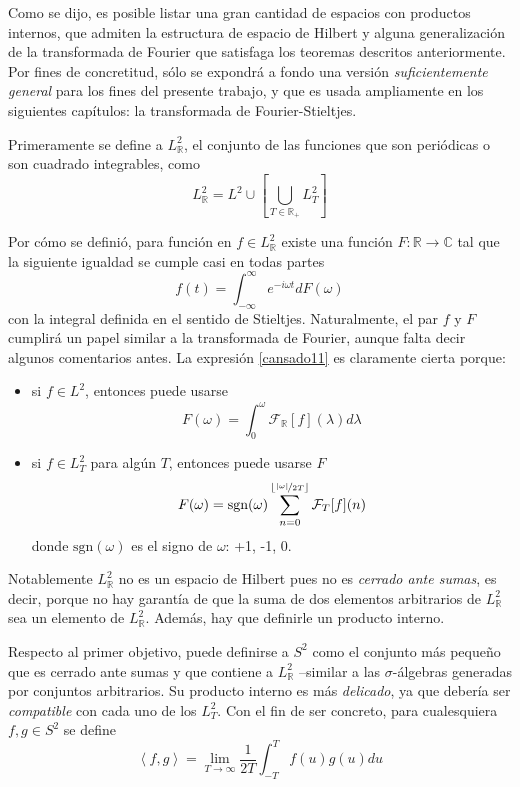 \documentclass[12pt,letterpaper]{book}
\newcommand{\R}{\mathbb{R}}
\newcommand{\C}{\mathbb{C}}
\newcommand{\intR}{\int_{-\infty}^{\infty}}
\newcommand{\abso}[1]{\left| #1 \right|}
\newcommand{\producto}[1]{\left\langle #1 \right\rangle}
\newcommand{\entero}[1]{\left\lfloor #1 \right\rfloor}
\begin{document}
Como se dijo, es posible listar una gran cantidad de espacios con productos internos, que admiten la estructura de espacio de Hilbert y alguna generalización de la transformada de Fourier que satisfaga los teoremas descritos anteriormente.
%
Por fines de concretitud, sólo se expondrá a fondo una versión \textit{suficientemente general} para los fines del presente trabajo, y que es usada ampliamente en los siguientes capítulos: la transformada de Fourier-Stieltjes.

Primeramente se define a $L^{2}_\R$, el conjunto de las funciones que son periódicas o son cuadrado integrables, como
\begin{equation}
L^{2}_\R = L^{2} \cup \left[ \bigcup_{T\in \R_+} L^{2}_T \right]
\end{equation}

Por cómo se definió, para función en $f \in L^{2}_\R$ existe una función $F: \R \rightarrow \C$ tal que la siguiente igualdad se cumple casi en todas partes
\begin{equation}
f(t) = \intR e^{-i \omega t} dF(\omega)
\label{cansado11}
\end{equation}
con la integral definida en el sentido de Stieltjes.
%
Naturalmente, el par $f$ y $F$ cumplirá un papel similar a la transformada de Fourier, aunque falta decir algunos comentarios antes.
%
La expresión \ref{cansado11} es claramente cierta porque:
\begin{itemize}
\item si $f \in L^{2}$, entonces puede usarse 
\begin{equation*}
F(\omega)=\int_{0}^{\omega} \mathcal{F}_\R[f](\lambda) d\lambda
\end{equation*}
\item si $f \in L^{2}_T$ para algún $T$, entonces puede usarse $F$
\begin{equation*}
F(\omega) =  \text{sgn}(\omega) \sum_{n = 0}^{\entero{\nicefrac{\abso{\omega}}{2T}}} \mathcal{F}_T[f](n)
\end{equation*}
donde $\text{sgn}(\omega)$ es el signo de $\omega$: +1, -1, 0. 
\end{itemize}

Notablemente $L^{2}_\R$ no es un espacio de Hilbert pues no es \textit{cerrado ante sumas}, es decir, porque no hay garantía de que la suma de dos elementos arbitrarios de $L^{2}_\R$ sea un elemento de $L^{2}_\R$.
%
Además, hay que definirle un producto interno.

Respecto al primer objetivo, puede definirse a $S^2$ como el conjunto más pequeño que es cerrado ante sumas y que contiene a $L^{2}_\R$ --similar a las $\sigma$-álgebras generadas por conjuntos arbitrarios.
%
Su producto interno es más \textit{delicado}, ya que debería ser \textit{compatible} con cada uno de los $L^{2}_T$.
%
Con el fin de ser concreto, para cualesquiera $f, g \in S^2$ se define 
\begin{equation}
\producto{f,g} = \lim_{T\rightarrow\infty} \frac{1}{2T} \int_{-T}^T f(u) g(u) du
\end{equation}
\end{document}
